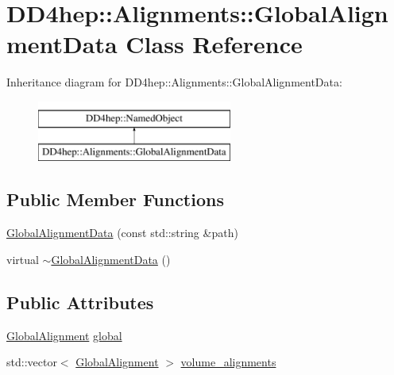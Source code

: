 \hypertarget{class_d_d4hep_1_1_alignments_1_1_global_alignment_data}{}\section{D\+D4hep\+:\+:Alignments\+:\+:Global\+Alignment\+Data Class Reference}
\label{class_d_d4hep_1_1_alignments_1_1_global_alignment_data}
Inheritance diagram for D\+D4hep\+:\+:Alignments\+:\+:Global\+Alignment\+Data\+:\begin{figure}[H]
\begin{center}
\leavevmode
\includegraphics[height=2.000000cm]{class_d_d4hep_1_1_alignments_1_1_global_alignment_data}
\end{center}
\end{figure}
\subsection*{Public Member Functions}
\begin{DoxyCompactItemize}
\item 
\hyperlink{class_d_d4hep_1_1_alignments_1_1_global_alignment_data_a57af2014192d0c3f26c8b47b7963236a}{Global\+Alignment\+Data} (const std\+::string \&path)
\item 
virtual \hyperlink{class_d_d4hep_1_1_alignments_1_1_global_alignment_data_aa835825012b4775e2cd9d6f286271533}{$\sim$\+Global\+Alignment\+Data} ()
\end{DoxyCompactItemize}
\subsection*{Public Attributes}
\begin{DoxyCompactItemize}
\item 
\hyperlink{class_d_d4hep_1_1_alignments_1_1_global_alignment}{Global\+Alignment} \hyperlink{class_d_d4hep_1_1_alignments_1_1_global_alignment_data_a353b81eec4fa99a0ed451a513a2dcc54}{global}
\item 
std\+::vector$<$ \hyperlink{class_d_d4hep_1_1_alignments_1_1_global_alignment}{Global\+Alignment} $>$ \hyperlink{class_d_d4hep_1_1_alignments_1_1_global_alignment_data_aaebd00327713124764b580f33523cdd5}{volume\+\_\+alignments}
\end{DoxyCompactItemize}



